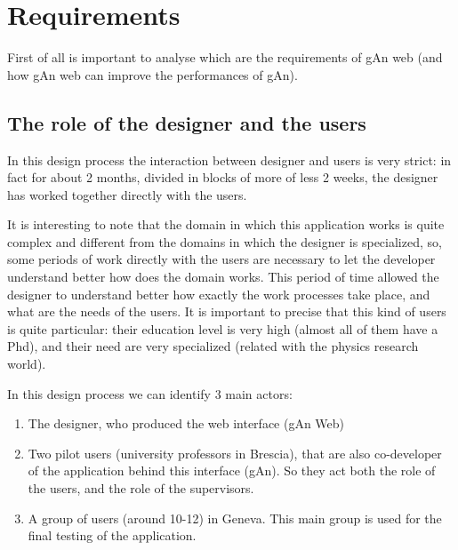 
\chapter{Requirements} %

\label{Chapter2} %


First of all is important to analyse which are the requirements of gAn web (and how gAn web can improve the performances of gAn). 

\section{The role of the designer and the users}
In this design process the interaction between designer and users is very strict: in fact for about 2 months, divided in blocks of more of less 2 weeks, the designer has worked together directly with the users. 

It is interesting to note that the domain in which this application works is quite complex and different from the domains in which the designer is specialized, so, some periods of work directly with the users are necessary to let the developer understand better how does the domain works.
This period of time allowed the designer to understand better how exactly the work processes take place, and what are the needs of the users. 
It is important to precise that this kind of users is quite particular: their education level is very high (almost all of them have a Phd), and their need are very specialized (related with the physics research world).

In this design process we can identify 3 main actors: 
\begin{enumerate}

\item
The designer, who produced the web interface (gAn Web)

\item 
Two pilot users (university professors in Brescia), that are also co-developer of the application behind this interface (gAn). So they act both the role of the users, and the role of the supervisors. 

\item A group of users (around 10-12) in Geneva. This main group is used for the final testing of the application.
 
\end{enumerate}

